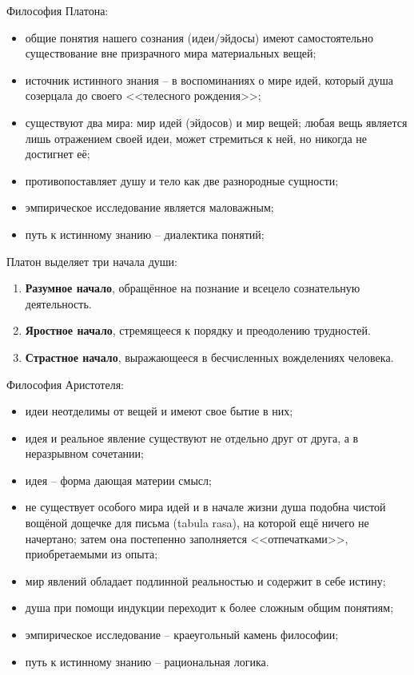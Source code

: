 
Философия Платона:
\begin{itemize}
    \itemsep-1ex
    \item общие понятия нашего сознания (идеи/эйдосы) имеют самостоятельно существование вне призрачного мира 
        материальных вещей;
    \item источник истинного знания -- в воспоминаниях о мире идей, который душа созерцала до своего 
        <<телесного рождения>>;
    \item существуют два мира: мир идей (эйдосов) и мир вещей; любая вещь является лишь отражением своей 
        идеи, может стремиться к ней, но никогда не достигнет её;
    \item противопоставляет душу и тело как две разнородные сущности;
    \item эмпирическое исследование является маловажным;
    \item путь к истинному знанию -- диалектика понятий;
\end{itemize}

Платон выделяет три начала души:
\begin{enumerate}
    \itemsep-1ex
    \item \textbf{Разумное начало}, обращённое на познание и всецело сознательную деятельность.
    \item \textbf{Яростное начало}, стремящееся к порядку и преодолению трудностей.
    \item \textbf{Страстное начало}, выражающееся в бесчисленных вожделениях человека.
\end{enumerate}

Философия Аристотеля:
\begin{itemize}
    \itemsep-1ex
    \item идеи неотделимы от вещей и имеют свое бытие в них;
    \item идея и реальное явление существуют не отдельно друг от друга, а в неразрывном сочетании;
    \item идея -- форма дающая материи смысл;
    \item не существует особого мира идей и в начале жизни душа подобна чистой вощёной дощечке для письма 
        (tabula rasa), на которой ещё ничего не начертано; затем она постепенно заполняется <<отпечатками>>, 
        приобретаемыми из опыта;
    \item мир явлений обладает подлинной реальностью и содержит в себе истину;
    \item душа при помощи индукции переходит к более сложным общим понятиям;
    \item эмпирическое исследование -- краеугольный камень философии;
    \item путь к истинному знанию -- рациональная логика.
\end{itemize}

